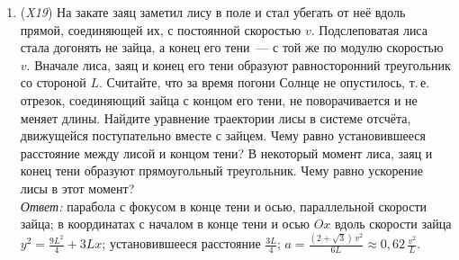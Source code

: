\documentclass[../main.tex]{subfiles}
\begin{document}
\begin{enumerate}
  \item (\textit{X19}) На закате заяц заметил лису в поле и стал убегать от неё вдоль
  прямой, соединяющей их, с постоянной скоростью $v$. Подслеповатая лиса стала
  догонять не зайца, а конец его тени~--- с той же по модулю скоростью $v$. Вначале
  лиса, заяц и конец его тени образуют равносторонний треугольник со стороной $L$.
  Считайте, что за время погони Солнце не опустилось, т.\,е. отрезок, соединяющий
  зайца с концом его тени, не поворачивается и не меняет длины. Найдите уравнение
  траектории лисы в системе отсчёта, движущейся поступательно вместе с зайцем. Чему
  равно установившееся расстояние между лисой и концом тени? В некоторый момент лиса,
  заяц и конец тени образуют прямоугольный треугольник. Чему равно ускорение лисы в
  этот момент?\\
  \textit{Ответ:} парабола с фокусом в конце тени и осью, параллельной скорости зайца;
  в координатах с началом в конце тени и осью $Ox$ вдоль скорости зайца
  $y^2 = \frac{9L^2}{4} + 3Lx$; установившееся расстояние $\frac{3L}{4}$;
  $a = \frac{(2 + \sqrt{3})\,v^2}{6L} \approx 0{,}62\,\frac{v^2}{L}$.
\end{enumerate}

\renewcommand{\thesection}{\arabic{section}}
\renewcommand{\thesubsection}{\arabic{section}.\arabic{subsection}}
\addtocounter{section}{-1}
\end{document}
